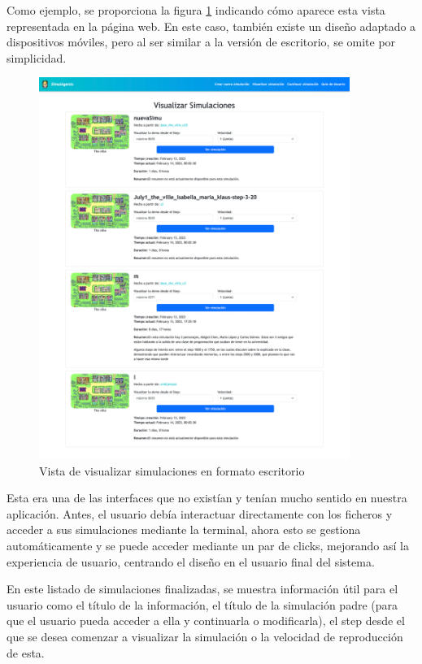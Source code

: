Como ejemplo, se proporciona la figura \ref{fig:visSimDesktop} indicando cómo aparece esta vista representada en la página web. En este caso, también existe un diseño adaptado a dispositivos móviles, pero al ser similar a la versión de escritorio, se omite por simplicidad.

\begin{figure}[H]
	\centering
	\includegraphics[width = 0.9\textwidth]{Imagenes/Vectorial/vistaVisSimu.png}
	\caption{Vista de visualizar simulaciones en formato escritorio}
	\label{fig:visSimDesktop}
\end{figure}

Esta era una de las interfaces que no existían y tenían mucho sentido en nuestra aplicación. Antes, el usuario debía interactuar directamente con los ficheros y acceder a sus simulaciones mediante la terminal, ahora esto se gestiona automáticamente y se puede acceder mediante un par de clicks, mejorando así la experiencia de usuario, centrando el diseño en el usuario final del sistema.

En este listado de simulaciones finalizadas, se muestra información útil para el usuario como el título de la información, el título de la simulación padre (para que el usuario pueda acceder a ella y continuarla o modificarla), el step desde el que se desea comenzar a visualizar la simulación o la velocidad de reproducción de esta.

